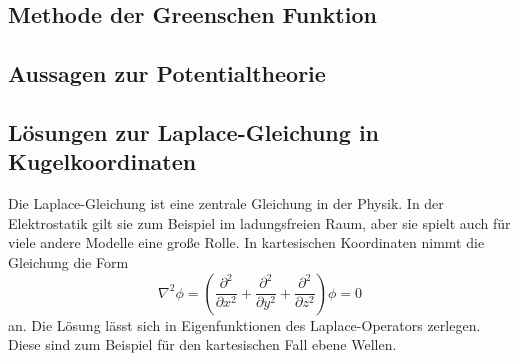 \subsection{Methode der Greenschen Funktion\label{ref-030}}

\subsection{Aussagen zur Potentialtheorie\label{mark-3.5.3}}

\subsection{Lösungen zur Laplace-Gleichung in Kugelkoordinaten\label{ref-031}}

Die Laplace-Gleichung ist eine zentrale Gleichung in der Physik. In der Elektrostatik gilt sie zum Beispiel im ladungsfreien Raum, aber sie spielt auch für viele andere Modelle eine große Rolle. In kartesischen Koordinaten nimmt die Gleichung die Form
\begin{equation*}
	\nabla ^{2}\phi =\left(\frac{\partial ^{2}}{\partial x^{2}}+\frac{\partial ^{2}}{\partial y^{2}}+\frac{\partial ^{2}}{\partial z^{2}}\right)\phi =0
\end{equation*}
an. Die Lösung lässt sich in Eigenfunktionen des Laplace-Operators zerlegen. Diese sind zum Beispiel für den kartesischen Fall ebene Wellen.

